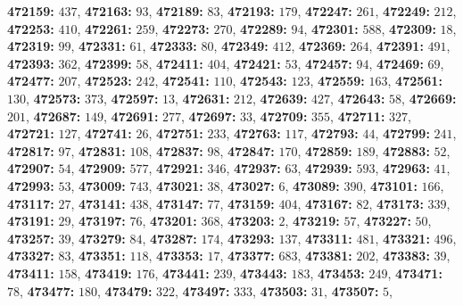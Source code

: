\textsf{\bfseries 472159:} $437$, \textsf{\bfseries 472163:} $93$, \textsf{\bfseries 472189:} $83$, \textsf{\bfseries 472193:} $179$, \textsf{\bfseries 472247:} $261$, \textsf{\bfseries 472249:} $212$, \textsf{\bfseries 472253:} $410$, \textsf{\bfseries 472261:} $259$, \textsf{\bfseries 472273:} $270$, \textsf{\bfseries 472289:} $94$, \textsf{\bfseries 472301:} $588$, \textsf{\bfseries 472309:} $18$, \textsf{\bfseries 472319:} $99$, \textsf{\bfseries 472331:} $61$, \textsf{\bfseries 472333:} $80$, \textsf{\bfseries 472349:} $412$, \textsf{\bfseries 472369:} $264$, \textsf{\bfseries 472391:} $491$, \textsf{\bfseries 472393:} $362$, \textsf{\bfseries 472399:} $58$, \textsf{\bfseries 472411:} $404$, \textsf{\bfseries 472421:} $53$, \textsf{\bfseries 472457:} $94$, \textsf{\bfseries 472469:} $69$, \textsf{\bfseries 472477:} $207$, \textsf{\bfseries 472523:} $242$, \textsf{\bfseries 472541:} $110$, \textsf{\bfseries 472543:} $123$, \textsf{\bfseries 472559:} $163$, \textsf{\bfseries 472561:} $130$, \textsf{\bfseries 472573:} $373$, \textsf{\bfseries 472597:} $13$, \textsf{\bfseries 472631:} $212$, \textsf{\bfseries 472639:} $427$, \textsf{\bfseries 472643:} $58$, \textsf{\bfseries 472669:} $201$, \textsf{\bfseries 472687:} $149$, \textsf{\bfseries 472691:} $277$, \textsf{\bfseries 472697:} $33$, \textsf{\bfseries 472709:} $355$, \textsf{\bfseries 472711:} $327$, \textsf{\bfseries 472721:} $127$, \textsf{\bfseries 472741:} $26$, \textsf{\bfseries 472751:} $233$, \textsf{\bfseries 472763:} $117$, \textsf{\bfseries 472793:} $44$, \textsf{\bfseries 472799:} $241$, \textsf{\bfseries 472817:} $97$, \textsf{\bfseries 472831:} $108$, \textsf{\bfseries 472837:} $98$, \textsf{\bfseries 472847:} $170$, \textsf{\bfseries 472859:} $189$, \textsf{\bfseries 472883:} $52$, \textsf{\bfseries 472907:} $54$, \textsf{\bfseries 472909:} $577$, \textsf{\bfseries 472921:} $346$, \textsf{\bfseries 472937:} $63$, \textsf{\bfseries 472939:} $593$, \textsf{\bfseries 472963:} $41$, \textsf{\bfseries 472993:} $53$, \textsf{\bfseries 473009:} $743$, \textsf{\bfseries 473021:} $38$, \textsf{\bfseries 473027:} $6$, \textsf{\bfseries 473089:} $390$, \textsf{\bfseries 473101:} $166$, \textsf{\bfseries 473117:} $27$, \textsf{\bfseries 473141:} $438$, \textsf{\bfseries 473147:} $77$, \textsf{\bfseries 473159:} $404$, \textsf{\bfseries 473167:} $82$, \textsf{\bfseries 473173:} $339$, \textsf{\bfseries 473191:} $29$, \textsf{\bfseries 473197:} $76$, \textsf{\bfseries 473201:} $368$, \textsf{\bfseries 473203:} $2$, \textsf{\bfseries 473219:} $57$, \textsf{\bfseries 473227:} $50$, \textsf{\bfseries 473257:} $39$, \textsf{\bfseries 473279:} $84$, \textsf{\bfseries 473287:} $174$, \textsf{\bfseries 473293:} $137$, \textsf{\bfseries 473311:} $481$, \textsf{\bfseries 473321:} $496$, \textsf{\bfseries 473327:} $83$, \textsf{\bfseries 473351:} $118$, \textsf{\bfseries 473353:} $17$, \textsf{\bfseries 473377:} $683$, \textsf{\bfseries 473381:} $202$, \textsf{\bfseries 473383:} $39$, \textsf{\bfseries 473411:} $158$, \textsf{\bfseries 473419:} $176$, \textsf{\bfseries 473441:} $239$, \textsf{\bfseries 473443:} $183$, \textsf{\bfseries 473453:} $249$, \textsf{\bfseries 473471:} $78$, \textsf{\bfseries 473477:} $180$, \textsf{\bfseries 473479:} $322$, \textsf{\bfseries 473497:} $333$, \textsf{\bfseries 473503:} $31$, \textsf{\bfseries 473507:} $5$, 
